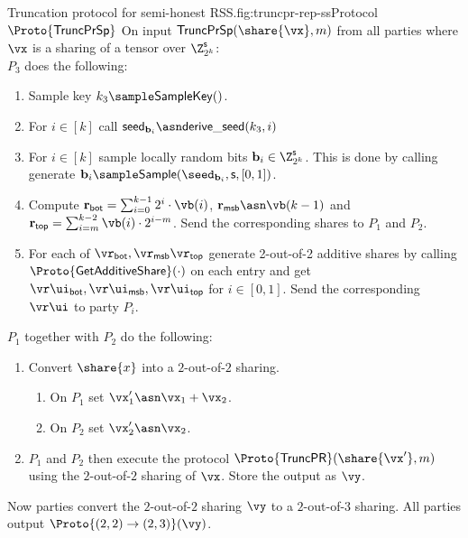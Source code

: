\begin{Boxfig}{Truncation protocol for semi-honest
RSS.}{fig:truncpr-rep-ss}{Protocol $\Proto{\mathsf{TruncPrSp}}$}
On input
$\mathsf{TruncPrSp}(\share{\vx}, m)$ from all parties where $\vx$ is a sharing
of a tensor over $\Z_{2^k}^{\mathsf{s}}$: \\
$P_3$ does the following:
  \begin{enumerate}
    \item Sample key $k_3 \sample \mathsf{SampleKey}()$.
    \item For $i \in [k]$ call $\mathsf{seed}_{\mathbf{b}_i} \asn \mathsf{derive\_seed}(k_3, i)$
    \item For $i \in [k]$ sample locally random bits $\mathbf{b}_i \in \Z_{2^k}^{\mathsf{s}}$.
    This is done by calling
    generate $\mathbf{b}_i \sample \mathsf{Sample}(\seed_{\mathbf{b}_i}, \mathsf{s}, [0,1])$.
    \item Compute
    $\mathbf{r}_{\mathsf{bot}} = \sum_{i=0}^{k-1}2^i \cdot \vb(i)$,
    $\mathbf{r}_{\mathsf{msb}} \asn \vb(k-1)$ and
    $\mathbf{r}_{\mathsf{top}} = \sum_{i=m}^{k-2} \vb(i) \cdot 2^{i-m}$. Send
    the corresponding shares to $P_1$ and $P_2$.
    \item For each of $\vr_{\mathsf{bot}}, \vr_{\mathsf{msb}} \vr_{\mathsf{top}}$
    generate 2-out-of-2 additive shares by calling $\Proto{\mathsf{GetAdditiveShare}}(\cdot)$
    on each entry and get $
    \vr\ui_{\mathsf{bot}}, \vr\ui_{\mathsf{msb}}, \vr\ui_{\mathsf{top}}$ for $i \in [0,1]$. Send the corresponding $\vr\ui$ to party $P_i$.
 \end{enumerate}
$P_1$ together with $P_2$ do the following:

\begin{enumerate}
   \item Convert $\share{x}$ into a $2$-out-of-$2$ sharing.
   \begin{enumerate}
      \item On $P_1$ set $\vx'_1 \asn \vx_1 + \vx_2$.
      \item On $P_2$ set $\vx'_2 \asn \vx_2$.
   \end{enumerate}

   \item $P_1$ and $P_2$ then execute the protocol $\Proto{\mathsf{TruncPR}}(\share{\vx'}, m)$
   using the $2$-out-of-$2$ sharing of $\vx$. Store the output as $\vy$.
\end{enumerate}

 Now parties convert the $2$-out-of-$2$ sharing $\vy$ to a $2$-out-of-$3$
 sharing. All parties output $\Proto{(2,2)\rightarrow(2,3)}(\vy)$.


\end{Boxfig}
